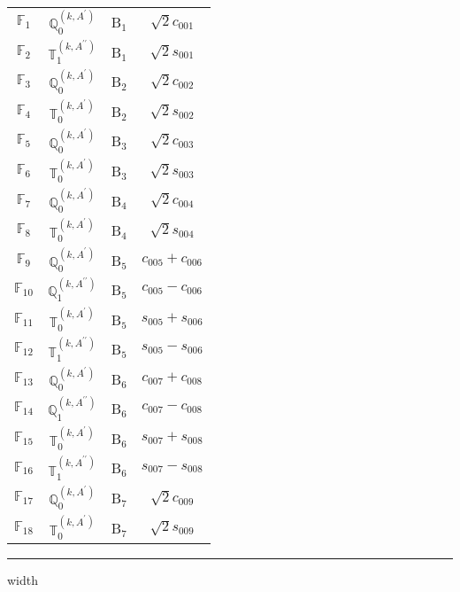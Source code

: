 \documentclass[fleqn,10pt,landscape]{article}
\begin{document}
\begin{itemize}
\begin{center}
\begin{longtable}{c|c|c|c}
$ \mathbb{F}_{1} $ & $\mathbb{Q}_{0}^{(k,A^{\prime})}$ & B$_{1}$ & $\sqrt{2} c_{001}$ \\
$ \mathbb{F}_{2} $ & $\mathbb{T}_{1}^{(k,A^{\prime\prime})}$ & B$_{1}$ & $\sqrt{2} s_{001}$ \\ \hline
$ \mathbb{F}_{3} $ & $\mathbb{Q}_{0}^{(k,A^{\prime})}$ & B$_{2}$ & $\sqrt{2} c_{002}$ \\
$ \mathbb{F}_{4} $ & $\mathbb{T}_{0}^{(k,A^{\prime})}$ & B$_{2}$ & $\sqrt{2} s_{002}$ \\ \hline
$ \mathbb{F}_{5} $ & $\mathbb{Q}_{0}^{(k,A^{\prime})}$ & B$_{3}$ & $\sqrt{2} c_{003}$ \\
$ \mathbb{F}_{6} $ & $\mathbb{T}_{0}^{(k,A^{\prime})}$ & B$_{3}$ & $\sqrt{2} s_{003}$ \\ \hline
$ \mathbb{F}_{7} $ & $\mathbb{Q}_{0}^{(k,A^{\prime})}$ & B$_{4}$ & $\sqrt{2} c_{004}$ \\
$ \mathbb{F}_{8} $ & $\mathbb{T}_{0}^{(k,A^{\prime})}$ & B$_{4}$ & $\sqrt{2} s_{004}$ \\ \hline
$ \mathbb{F}_{9} $ & $\mathbb{Q}_{0}^{(k,A^{\prime})}$ & B$_{5}$ & $c_{005} + c_{006}$ \\
$ \mathbb{F}_{10} $ & $\mathbb{Q}_{1}^{(k,A^{\prime\prime})}$ & B$_{5}$ & $c_{005} - c_{006}$ \\
$ \mathbb{F}_{11} $ & $\mathbb{T}_{0}^{(k,A^{\prime})}$ & B$_{5}$ & $s_{005} + s_{006}$ \\
$ \mathbb{F}_{12} $ & $\mathbb{T}_{1}^{(k,A^{\prime\prime})}$ & B$_{5}$ & $s_{005} - s_{006}$ \\ \hline
$ \mathbb{F}_{13} $ & $\mathbb{Q}_{0}^{(k,A^{\prime})}$ & B$_{6}$ & $c_{007} + c_{008}$ \\
$ \mathbb{F}_{14} $ & $\mathbb{Q}_{1}^{(k,A^{\prime\prime})}$ & B$_{6}$ & $c_{007} - c_{008}$ \\
$ \mathbb{F}_{15} $ & $\mathbb{T}_{0}^{(k,A^{\prime})}$ & B$_{6}$ & $s_{007} + s_{008}$ \\
$ \mathbb{F}_{16} $ & $\mathbb{T}_{1}^{(k,A^{\prime\prime})}$ & B$_{6}$ & $s_{007} - s_{008}$ \\ \hline
$ \mathbb{F}_{17} $ & $\mathbb{Q}_{0}^{(k,A^{\prime})}$ & B$_{7}$ & $\sqrt{2} c_{009}$ \\
$ \mathbb{F}_{18} $ & $\mathbb{T}_{0}^{(k,A^{\prime})}$ & B$_{7}$ & $\sqrt{2} s_{009}$ \\
\end{longtable}
\end{center}

 \hfil \hrule height 1mm width \textwidth \hfil


\end{itemize}
\end{document}
